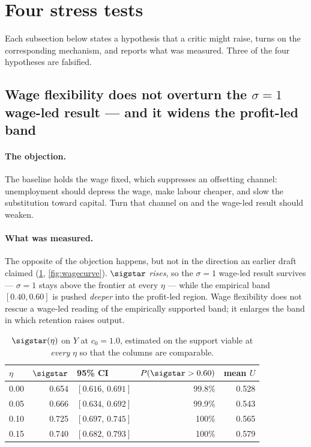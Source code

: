 
\section{Four stress tests}
\label{sec:stress}

Each subsection below states a hypothesis that a critic might raise, turns on
the corresponding mechanism, and reports what was measured. Three of the four
hypotheses are falsified.

\subsection{Wage flexibility does not overturn the
\texorpdfstring{$\sigma = 1$}{sigma = 1} wage-led result --- and it widens the
profit-led band}
\label{sec:wagecurve}

\paragraph{The objection.} The baseline holds the wage fixed, which suppresses
an offsetting channel: unemployment should depress the wage, make labour
cheaper, and slow the substitution toward capital. Turn that channel on and
the wage-led result should weaken.

\paragraph{What was measured.} The opposite of the objection happens, but not
in the direction an earlier draft claimed (\cref{tab:wagecurve},
\cref{fig:wagecurve}). $\sigstar$ \emph{rises}, so the $\sigma = 1$ wage-led
result survives --- $\sigma = 1$ stays above the frontier at every $\eta$ ---
while the empirical band $[0.40, 0.60]$ is pushed \emph{deeper} into the
profit-led region. Wage flexibility does not rescue a wage-led reading of the
empirically supported band; it enlarges the band in which retention raises
output.

\begin{table}[htbp]
\centering
\small
\caption{$\sigstar(\eta)$ on $Y$ at $c_0 = 1.0$, estimated on the support
viable at \emph{every} $\eta$ so that the columns are comparable.}
\label{tab:wagecurve}
\begin{tabular}{lrlrr}
\toprule
$\eta$ & $\sigstar$ & 95\% CI & $P(\sigstar > 0.60)$ & mean $U$\\
\midrule
0.00 & 0.654 & $[0.616,\,0.691]$ & 99.8\% & 0.528\\
0.05 & 0.666 & $[0.634,\,0.692]$ & 99.9\% & 0.543\\
0.10 & 0.725 & $[0.697,\,0.745]$ & 100\% & 0.565\\
0.15 & 0.740 & $[0.682,\,0.793]$ & 100\% & 0.579\\
\bottomrule
\end{tabular}
\end{table}

